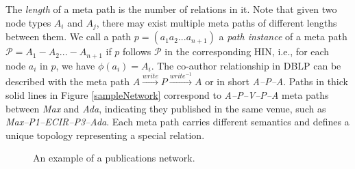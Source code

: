 The \textit{length} of a meta path is the number of relations in it. Note that given two node types $A_i$ and $A_j$, there may exist multiple meta paths of different lengths between them. We call a path $p = (a_1a_2...a_{n+1})$ a \textit{path instance} of a meta path $\mathcal{P} = A_1-A_2... -A_{n+1}$ if $p$ follows $\mathcal{P}$ in the corresponding HIN, i.e., for each node $a_i$ in $p$, we have $\phi(a_i)=A_i$. The co-author relationship in DBLP can be described with the meta path $A\xrightarrow{write}P\xrightarrow{write^{-1}}A$ or in short \textit{A--P--A}. Paths in thick solid lines in Figure \ref{sampleNetwork} correspond to \textit{A--P--V--P--A} meta paths between \textit{Max} and \textit{Ada}, indicating they published in the same venue, such as \textit{Max--P1--ECIR--P3--Ada}. Each meta path carries different semantics and defines a unique topology representing a special relation. %

\begin{figure}[t]
\centering
\hspace{0.6cm}
\caption{An example of a publications network.}
\end{figure}


